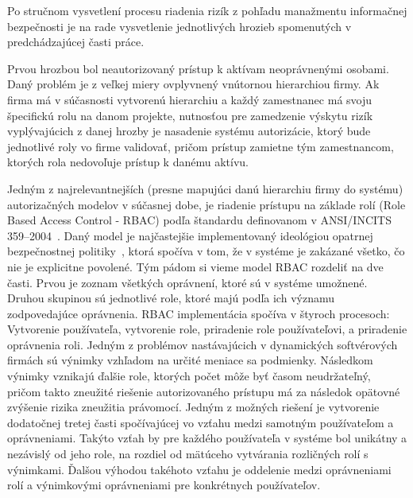 Po stručnom vysvetlení procesu riadenia rizík z pohľadu manažmentu informačnej bezpečnosti je na rade vysvetlenie
jednotlivých hrozieb spomenutých v predchádzajúcej časti práce.

Prvou hrozbou bol neautorizovaný prístup k aktívam neoprávnenými osobami.
Daný problém je z veľkej miery ovplyvnený vnútornou hierarchiou firmy.
Ak firma má v súčasnosti vytvorenú hierarchiu a každý zamestnanec má svoju špecifickú rolu na danom projekte, nutnosťou
pre zamedzenie výskytu rizík vyplývajúcich z danej hrozby je nasadenie systému autorizácie, ktorý bude jednotlivé roly
vo firme validovať, pričom prístup zamietne tým zamestnancom, ktorých rola nedovoľuje prístup k danému aktívu.

Jedným z najrelevantnejších (presne mapujúci danú hierarchiu firmy do systému) autorizačných modelov v súčasnej dobe, je riadenie prístupu na základe rolí (Role Based
Access Control - RBAC) podľa štandardu definovanom v ANSI/INCITS 359–2004~\cite{RBAC}.
Daný model je najčastejšie implementovaný ideológiou opatrnej bezpečnostnej politiky~\cite{OpatrnaBezpecnostnaPolitika},
ktorá spočíva v tom, že v systéme je zakázané všetko, čo nie je explicitne povolené.
Tým pádom si vieme model RBAC rozdeliť na dve časti.
Prvou je zoznam všetkých oprávnení, ktoré sú v systéme umožnené.
Druhou skupinou sú jednotlivé role, ktoré majú podľa ich významu zodpovedajúce oprávnenia.
RBAC implementácia spočíva v štyroch procesoch: Vytvorenie používateľa, vytvorenie role, priradenie role používateľovi,
a priradenie oprávnenia roli.
Jedným z problémov nastávajúcich v dynamických softvérových firmách sú výnimky vzhľadom na určité meniace sa podmienky.
Následkom výnimky vznikajú ďalšie role, ktorých počet môže byť časom neudržateľný,
pričom takto zneužité riešenie autorizovaného prístupu má za následok opätovné zvýšenie rizika zneužitia právomocí.
Jedným z možných riešení je vytvorenie dodatočnej tretej časti spočívajúcej vo vzťahu medzi samotným používateľom a oprávneniami.
Takýto vzťah by pre každého používateľa v systéme bol unikátny a nezávislý od jeho role, na rozdiel od mätúceho
vytvárania rozličných rolí s výnimkami.
Ďalšou výhodou takéhoto vzťahu je oddelenie medzi oprávneniami rolí a výnimkovými oprávneniami pre konkrétnych používateľov.

